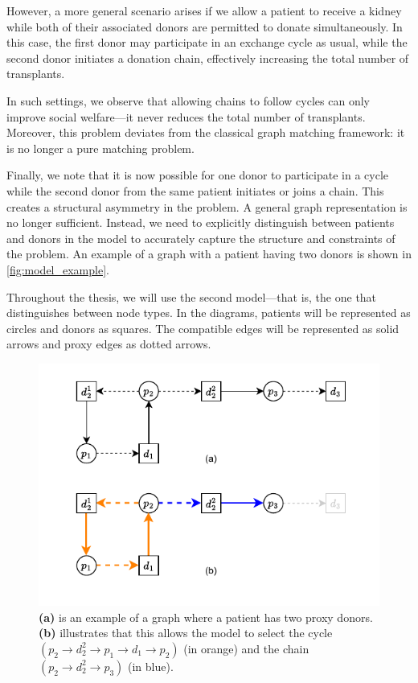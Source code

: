 However, a more general scenario arises if we allow a patient to receive a kidney while both of their associated donors are permitted to donate simultaneously. In this case, the first donor may participate in an exchange cycle as usual, while the second donor initiates a donation chain, effectively increasing the total number of transplants. 

In such settings, we observe that allowing chains to follow cycles can only improve social welfare—it never reduces the total number of transplants. Moreover, this problem deviates from the classical graph matching framework: it is no longer a pure matching problem.


Finally, we note that it is now possible for one donor to participate in a cycle while the second donor from the same patient initiates or joins a chain. This creates a structural asymmetry in the problem. A general graph representation is no longer sufficient. Instead, we need to explicitly distinguish between patients and donors in the model to accurately capture the structure and constraints of the problem. An example of a graph with a patient having two donors is shown in \autoref{fig:model_example}.

Throughout the thesis, we will use the second model—that is, the one that distinguishes between node types. In the diagrams, patients will be represented as circles and donors as squares. The compatible edges will be represented as solid arrows and proxy edges as dotted arrows.

\begin{figure}
    \centering
    \includegraphics{data/model_example.pdf}
    \caption[An example of a graph with a patient having two donors]{\textbf{(a)} is an example of a graph where a patient has two proxy donors. \textbf{(b)} illustrates that this allows the model to select the cycle $(p_2 \rightarrow d_2^2 \rightarrow p_1 \rightarrow d_1 \rightarrow p_2)$ (in orange) and the chain $(p_2 \rightarrow d_2^2 \rightarrow p_3)$ (in blue).}
    \label{fig:model_example}
\end{figure}

